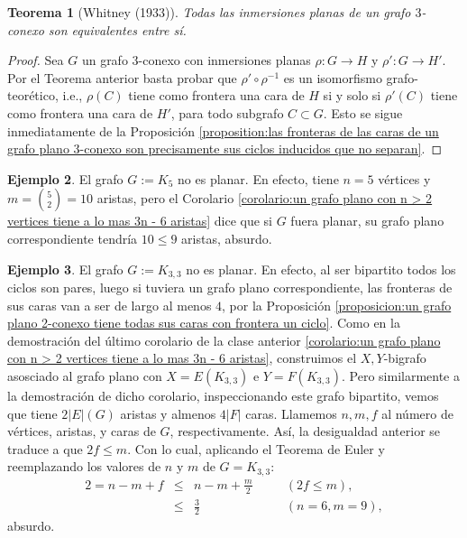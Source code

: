\documentclass[12pt]{report}
\theoremstyle{plain}
\newtheorem{theorem}{Teorema}[section]
\theoremstyle{definition}
\newtheorem{example}[theorem]{Ejemplo}
\newcommand{\abs}[1]{\left \vert #1 \right \vert}
\begin{document}
\begin{theorem}[Whitney (1933)]
Todas las inmersiones planas de un grafo $3$-conexo son equivalentes entre sí.
\end{theorem}
\begin{proof}
Sea $G$ un grafo $3$-conexo con inmersiones planas $\rho : G \rightarrow H$ y $\rho' : G \rightarrow H'$. Por el Teorema anterior basta probar que $\rho' \circ \rho^{-1}$ es un isomorfismo grafo-teorético, i.e., $\rho(C)$ tiene como frontera una cara de $H$ si y solo si $\rho ' (C)$ tiene como frontera una cara de $H'$, para todo subgrafo $C \subset G$. Esto se sigue inmediatamente de la Proposición \ref{proposition:las fronteras de las caras de un grafo plano 3-conexo son precisamente sus ciclos inducidos que no separan}.
\end{proof}
















\begin{example}
El grafo $G := K_5$ no es planar. En efecto, tiene $n= 5$ vértices y $m = \binom 5 2 = 10$ aristas, pero el Corolario \ref{corolario:un grafo plano con n > 2 vertices tiene a lo mas 3n - 6 aristas} dice que si $G$ fuera planar, su grafo plano correspondiente tendría $10 \leq 9$ aristas, absurdo.
\end{example}

\begin{example}
El grafo $G := K_{3,3}$ no es planar. En efecto, al ser bipartito todos los ciclos son pares, luego si tuviera un grafo plano correspondiente, las fronteras de sus caras van a ser de largo al menos $4$, por la Proposición \ref{proposicion:un grafo plano 2-conexo tiene todas sus caras con frontera un ciclo}. Como en la demostración del último corolario de la clase anterior \ref{corolario:un grafo plano con n > 2 vertices tiene a lo mas 3n - 6 aristas}, construimos el $X,Y$-bigrafo asosciado al grafo plano con $X = E(K_{3,3})$ e $Y = F(K_{3,3})$. Pero similarmente a la demostración de dicho corolario, inspeccionando este grafo bipartito, vemos que tiene $2 \abs E (G)$ aristas y almenos $4 \abs F$ caras. Llamemos $n,m,f$ al número de vértices, aristas, y caras de $G$, respectivamente. Así, la desigualdad anterior se traduce a que $2 f \leq m$. Con lo cual, aplicando el Teorema de Euler y reemplazando los valores de $n$ y $m$ de $G = K_{3,3}$:
\[
    \begin{array}{lllll}
    2 = n - m + f & \leq & n - m + \frac m 2 & \quad & (2 f \leq m), \\
                    & \leq & \frac 3 2 & \quad & (n = 6, m = 9),
    \end{array}
\]
absurdo.
\end{example}
\end{document}
